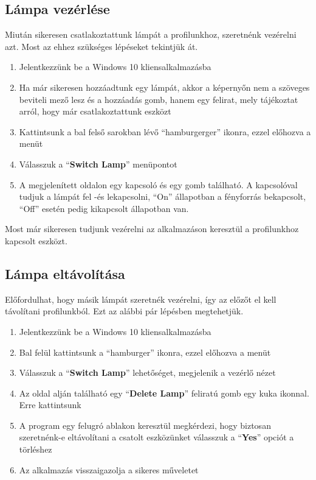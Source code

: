 \documentclass[a4paper,12pt]{report}
\begin{document}
\subsection{Lámpa vezérlése}
    Miután sikeresen csatlakoztattunk lámpát a profilunkhoz, szeretnénk vezérelni azt. Most az ehhez szükséges lépéseket tekintjük át.

\begin{enumerate}
    \item Jelentkezzünk be a Windows 10 kliensalkalmazásba
    \item Ha már sikeresen hozzáadtunk egy lámpát, akkor a képernyőn nem a szöveges beviteli mező lesz és a hozzáadás gomb, hanem
    egy felirat, mely tájékoztat arról, hogy már csatlakoztattunk eszközt
    \item Kattintsunk a bal felső sarokban lévő ``hamburgerger'' ikonra, ezzel előhozva a menüt
    \item Válasszuk a ``\textbf{Switch Lamp}'' menüpontot
    \item A megjelenített oldalon egy kapcsoló és egy gomb található. A kapcsolóval tudjuk a lámpát fel -és lekapcsolni, ``On''
    állapotban a fényforrás bekapcsolt, ``Off'' esetén pedig kikapcsolt állapotban van.
\end{enumerate}

    Most már sikeresen tudjunk vezérelni az alkalmazáson keresztül a profilunkhoz kapcsolt eszközt.

\subsection{Lámpa eltávolítása}
    Előfordulhat, hogy másik lámpát szeretnék vezérelni, így az előzőt el kell távolítani profilunkból. Ezt az alábbi pár lépésben
    megtehetjük.

\begin{enumerate}
    \item Jelentkezzünk be a Windows 10 kliensalkalmazásba
    \item Bal felül kattintsunk a ``hamburger'' ikonra, ezzel előhozva a menüt
    \item Válasszuk a ``\textbf{Switch Lamp}'' lehetőséget, megjelenik a vezérlő nézet
    \item Az oldal alján található egy ``\textbf{Delete Lamp}'' feliratú gomb egy kuka ikonnal. Erre kattintsunk
    \item A program egy felugró ablakon keresztül megkérdezi, hogy biztosan szeretnénk-e eltávolítani a csatolt eszközünket
    válasszuk a ``\textbf{Yes}'' opciót a törléshez
    \item Az alkalmazás visszaigazolja a sikeres műveletet
\end{enumerate}
\end{document}
